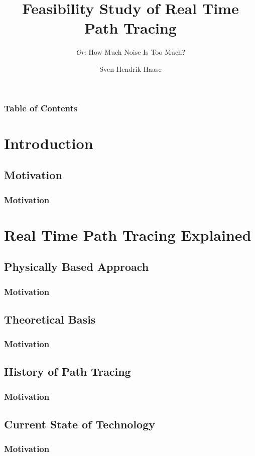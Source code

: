 \documentclass{beamer}
\title[Path Tracing]
{Feasibility Study of Real Time Path Tracing}
\subtitle{\textit{Or:} How Much Noise Is Too Much?}
\author[Haase]{Sven-Hendrik Haase}
\institute[University of Hamburg]{
    Department of Computer Science\\
    University of Hamburg
}
\begin{document}
\frame{\titlepage}
\begin{frame}
    \frametitle{Table of Contents}
    \tableofcontents
\end{frame}

\section{Introduction}

\subsection{Motivation}
\begin{frame}
    \frametitle{Motivation}
    \lipsum[2]
\end{frame}

\section{Real Time Path Tracing Explained}

\subsection{Physically Based Approach}
\begin{frame}
    \frametitle{Motivation}
    \lipsum[2]
\end{frame}

\subsection{Theoretical Basis}
\begin{frame}
    \frametitle{Motivation}
    \lipsum[2]
\end{frame}

\subsection{History of Path Tracing}
\begin{frame}
    \frametitle{Motivation}
    \lipsum[2]
\end{frame}

\subsection{Current State of Technology}
\begin{frame}
    \frametitle{Motivation}
    \lipsum[2]
\end{frame}
\end{document}
